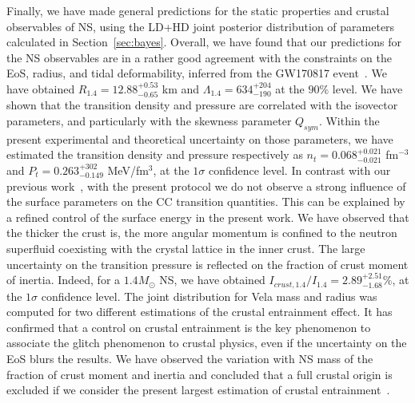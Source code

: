 Finally, we have made general predictions for the static properties and crustal 
observables of NS, using the LD+HD joint posterior distribution of parameters 
calculated in Section~\ref{sec:bayes}. Overall, we have found that our 
predictions for the NS observables are in a rather good agreement with the
constraints on the EoS, radius, and tidal deformability, inferred from the 
GW170817 event~\cite{De2018,GW1}. We have obtained 
$R_{1.4}=12.88_{-0.65}^{+0.53}$ km and $\Lambda_{1.4} = 634_{-190}^{+204}$ at 
the $90\%$ level. 
We have shown that the transition density and pressure are 
correlated with the isovector parameters, and particularly with the skewness 
parameter $Q_{sym}$. Within the present experimental and theoretical 
uncertainty on those parameters, we have estimated the transition density and
pressure respectively as $n_t=0.068_{-0.021}^{+0.021}$ fm$^{-3}$ and
$P_t=0.263_{-0.149}^{+302}$ MeV/fm$^3$, at the $1\sigma$ confidence level. In
contrast with our previous work~\cite{Carreau2019cc}, with the present protocol 
we do not observe a strong influence of
the surface parameters on the CC transition quantities. This can be explained 
by a refined control of the surface energy in the present work.
We have observed that the thicker the crust is, the more angular momentum is
confined to the neutron superfluid coexisting with the crystal lattice in the
inner crust. The large uncertainty on the transition pressure is reflected on
the fraction of crust moment of inertia. Indeed, for a $1.4M_\odot$ NS, we have 
obtained $I_{crust,1.4}/I_{1.4}=2.89_{-1.68}^{+2.51} \%$, at the $1\sigma$ 
confidence level. The joint distribution for Vela mass and radius was
computed for two different estimations of the crustal entrainment effect. It 
has confirmed that a control on crustal entrainment is the key phenomenon to
associate the glitch phenomenon to crustal physics, even if the uncertainty on
the EoS blurs the results. We have observed the variation with NS
mass of the fraction of crust moment and inertia and concluded that a full 
crustal origin is excluded if we consider the present largest estimation of 
crustal entrainment~\cite{Delsate2016}.

\clearpage\thispagestyle{empty}
